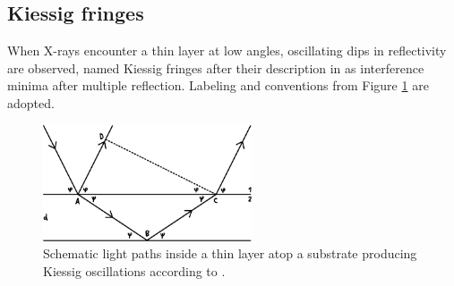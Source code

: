 \subsection{Kiessig fringes}

When X-rays encounter a thin layer at low angles, oscillating dips in reflectivity are observed, named Kiessig fringes
after their description in \cite{Kiessig_1931} as interference minima after multiple reflection. Labeling and conventions
from Figure \ref{fig:kiessig} are adopted.

\begin{figure}[H]
	\centering
	\includegraphics[width=0.55\textwidth]{content/graphics/kiessig.pdf}
	\caption{Schematic light paths inside a thin layer atop a substrate producing Kiessig oscillations according to \cite{Kiessig_1931}.}
	\label{fig:kiessig}
\end{figure}

